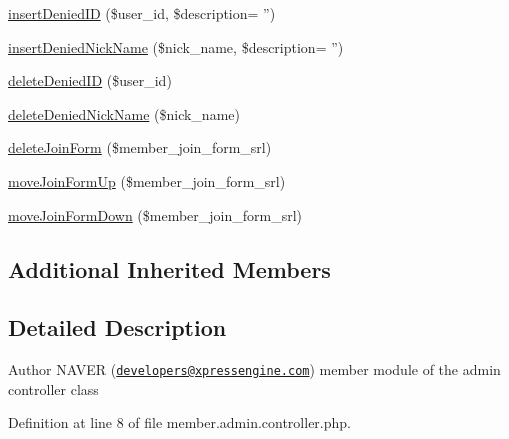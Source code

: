 \begin{DoxyCompactItemize}
\item 
\hyperlink{classmemberAdminController_ac60bb370f5cac395c99b05723ece5ccb}{insert\+Denied\+I\+D} (\$user\+\_\+id, \$description= '')
\item 
\hyperlink{classmemberAdminController_af3b39a52edd371b5dd5071987f25ed64}{insert\+Denied\+Nick\+Name} (\$nick\+\_\+name, \$description= '')
\item 
\hyperlink{classmemberAdminController_af7f02615adb1cbd7b8b91a330bda1a38}{delete\+Denied\+I\+D} (\$user\+\_\+id)
\item 
\hyperlink{classmemberAdminController_a20792ed4ccef3abf09eb3fbd5dd955fb}{delete\+Denied\+Nick\+Name} (\$nick\+\_\+name)
\item 
\hyperlink{classmemberAdminController_a3fbfbbc1a77c7aaaed901e08fd2ec09c}{delete\+Join\+Form} (\$member\+\_\+join\+\_\+form\+\_\+srl)
\item 
\hyperlink{classmemberAdminController_a6ab62c7dab973a7dc4d12b7739d82660}{move\+Join\+Form\+Up} (\$member\+\_\+join\+\_\+form\+\_\+srl)
\item 
\hyperlink{classmemberAdminController_a07d6306d7ed6eadca11fdc8ca9eb10d4}{move\+Join\+Form\+Down} (\$member\+\_\+join\+\_\+form\+\_\+srl)
\end{DoxyCompactItemize}
\subsection*{Additional Inherited Members}


\subsection{Detailed Description}
\begin{DoxyAuthor}{Author}
N\+A\+V\+E\+R (\href{mailto:developers@xpressengine.com}{\tt developers@xpressengine.\+com}) member module of the admin controller class 
\end{DoxyAuthor}


Definition at line 8 of file member.\+admin.\+controller.\+php.



